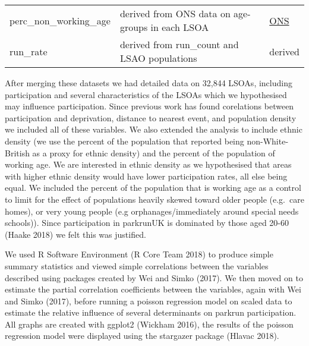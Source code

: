 \documentclass[]{article}
\begin{document}
\begin{longtable}[]{@{}lll@{}}
\begin{minipage}[t]{0.22\columnwidth}
perc\_non\_working\_age\strut
\end{minipage} & \begin{minipage}[t]{0.33\columnwidth}\raggedright
derived from ONS data on age-groups in each LSOA\strut
\end{minipage} & \begin{minipage}[t]{0.37\columnwidth}\raggedright
\href{https://www.ons.gov.uk/peoplepopulationandcommunity/populationandmigration/populationestimates/datasets/lowersuperoutputareamidyearpopulationestimates}{ONS}\strut
\end{minipage}\tabularnewline
\begin{minipage}[t]{0.22\columnwidth}\raggedright
run\_rate\strut
\end{minipage} & \begin{minipage}[t]{0.33\columnwidth}\raggedright
derived from run\_count and LSAO populations\strut
\end{minipage} & \begin{minipage}[t]{0.37\columnwidth}\raggedright
derived\strut
\end{minipage}\tabularnewline
\bottomrule
\end{longtable}

After merging these datasets we had detailed data on 32,844 LSOAs,
including participation and several characteristics of the LSOAs which
we hypothesised may influence participation. Since previous work has
found corelations between participation and deprivation, distance to
nearest event, and population density we included all of these
variables. We also extended the analysis to include ethnic density (we
use the percent of the population that reported being non-White-British
as a proxy for ethnic density) and the percent of the population of
working age. We are interested in ethnic density as we hypothesised that
areas with higher ethnic density would have lower participation rates,
all else being equal. We included the percent of the population that is
working age as a control to limit for the effect of populations heavily
skewed toward older people (e.g.~care homes), or very young people (e.g
orphanages/immediately around special needs schools)). Since
participation in parkrunUK is dominated by those aged 20-60 (Haake 2018)
we felt this was justified.

We used R Software Environment (R Core Team 2018) to produce simple
summary statistics and viewed simple correlations between the variables
described using packages created by Wei and Simko (2017). We then moved
on to estimate the partial correlation coefficients between the
variables, again with Wei and Simko (2017), before running a poisson
regression model on scaled data to estimate the relative influence of
several determinants on parkrun participation. All graphs are created
with ggplot2 (Wickham 2016), the results of the poisson regression model
were displayed using the stargazer package (Hlavac 2018).
\end{document}
